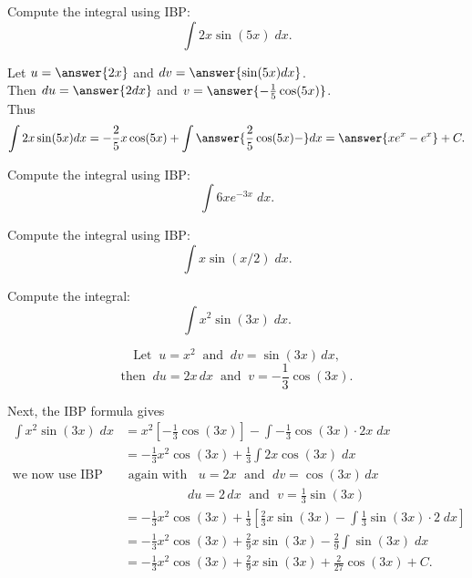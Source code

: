 \documentclass{ximera}
\begin{document}
\begin{problem}
Compute the integral using IBP:
  \[
  \int 2x\sin(5x)\;dx.
  \]

Let $u = \answer{2x}$   and   $dv = \answer{\sin(5x) dx}$.\\
  Then $du = \answer{2 dx}$   and   $v = \answer{-\frac15 \cos(5x)}$.\\
  Thus 
  \[
  \int 2x\sin(5x) dx = -\frac25 x\cos(5x) + \int \answer{\frac25 \cos(5x)-} dx = \answer{xe^x - e^x} + C.
  \]
  
\end{problem}


\begin{problem}
Compute the integral using IBP:
  \[
  \int 6xe^{-3x} \;dx.
  \]

\end{problem}


\begin{problem}
Compute the integral using IBP:
  \[
  \int x\sin(x/2) \;dx.
  \]

\end{problem}


\begin{example}
Compute the integral:
  \[
  \int x^2\sin(3x) \;dx.
  \]

\[
\text{Let} \;\; u = x^2 \;\; \text{and} \;\; dv = \sin(3x) \,dx,
\]
\[
\text{then} \;\; du = 2x \,dx \;\; \text{and} \;\; v = -\frac13 \cos(3x).
\]

Next, the IBP formula gives
\begin{align*}
\int x^2\sin(3x) \;dx &= x^2\left[-\frac13 \cos(3x)\right] - \int -\frac13 \cos(3x) \cdot 2x \; dx \\
                       &= -\frac13 x^2\cos(3x) + \frac13 \int 2x\cos(3x) \; dx\\                               
\text{we now use IBP} & \text{ again with } \;\; u = 2x \;\text{ and } \; dv = \cos(3x) \, dx\\
& \qquad \qquad \quad du = 2 \, dx \; \text{ and } \; v=\frac13 \sin(3x)\\
                       &= -\frac13 x^2\cos(3x) + \frac13\left[\frac23x\sin(3x) -  \int \frac13 \sin(3x)\cdot 2 \; dx\right]\\
                       &= -\frac13 x^2\cos(3x) + \frac29x\sin(3x) - \frac29 \int  \sin(3x) \; dx\\
                       &= -\frac13 x^2\cos(3x) + \frac29x\sin(3x) + \frac{2}{27} \cos(3x) + C.
\end{align*}

\end{example}
\end{document}
